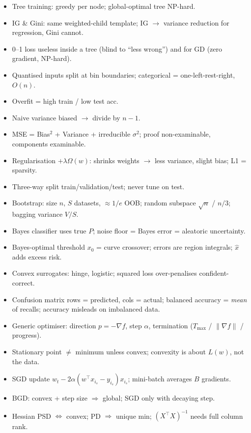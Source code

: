 \documentclass[11pt, a4paper]{article}
\begin{document}
\begin{tldrbox}
\begin{itemize}[leftmargin=*]
  \item Tree training: greedy per node; global-optimal tree NP-hard.
  \item IG \& Gini: same weighted-child template; IG $\to$ variance reduction for regression, Gini cannot.
  \item 0--1 loss useless inside a tree (blind to ``less wrong'') and for GD (zero gradient, NP-hard).
  \item Quantised inputs split at bin boundaries; categorical = one-left-rest-right, $O(n)$.
  \item Overfit = high train / low test acc.
  \item Naive variance biased $\to$ divide by $n-1$.
  \item MSE = Bias$^2$ + Variance + irreducible $\sigma^2$; proof non-examinable, components examinable.
  \item Regularisation $+\lambda\Omega(w)$: shrinks weights $\to$ less variance, slight bias; L1 = sparsity.
  \item Three-way split train/validation/test; never tune on test.
  \item Bootstrap: size $n$, $S$ datasets, $\approx1/e$ OOB; random subspace $\sqrt n$ / $n/3$;
  bagging variance $V/S$.
  \item Bayes classifier uses true $P$; noise floor = Bayes error = aleatoric uncertainty.
  \item Bayes-optimal threshold $x_0$ = curve crossover; errors are region integrals; $\hat x$ adds excess risk.
  \item Convex surrogates: hinge, logistic; squared loss over-penalises confident-correct.
  \item Confusion matrix rows = predicted, cols = actual; balanced accuracy = \emph{mean} of recalls;
  accuracy misleads on imbalanced data.
  \item Generic optimiser: direction $p=-\nabla f$, step $\alpha$, termination ($T_{\max}$ / $\|\nabla f\|$ / progress).
  \item Stationary point $\ne$ minimum unless convex; convexity is about $L(w)$, not the data.
  \item SGD update $w_t-2\alpha(w^\top x_{i_s}-y_{i_s})x_{i_s}$; mini-batch averages $B$ gradients.
  \item BGD: convex + step size $\Rightarrow$ global; SGD only with decaying step.
  \item Hessian PSD $\iff$ convex; PD $\Rightarrow$ unique min; $(X^\top X)^{-1}$ needs full column rank.

\end{itemize}
\end{tldrbox}
\end{document}
